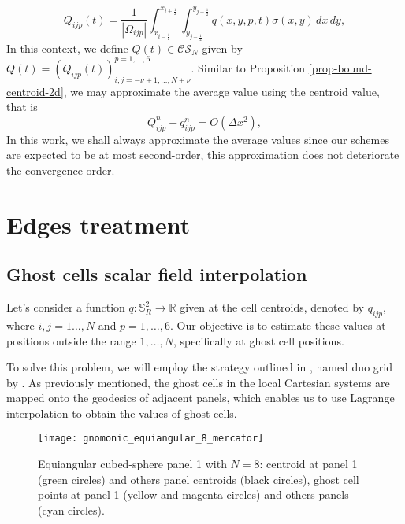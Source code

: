 \begin{equation*}
	Q_{ijp}(t) = \frac{1}{|\Omega_{ijp}|}\int_{x_{i-\frac{1}{2}}}^{x_{i+\frac{1}{2}}}
	\int_{y_{j-\frac{1}{2}}}^{y_{j+\frac{1}{2}}}  q(x,y,p,t) {\sigma(x,y)}\,dx \,dy,
\end{equation*}
In this context, we define $Q(t) \in \mathcal{CS}_N$ given by 
$Q(t) = (Q_{ijp}(t))_{i,j = -\nu +1, \ldots, N+\nu}^{p=1,\ldots,6}$.
Similar to Proposition \ref{prop-bound-centroid-2d}, we may approximate the average value using the centroid value, that is
\begin{equation*}
	Q_{ijp}^n - q_{ijp}^n = O(\Delta x ^2), 
\end{equation*}
In this work, we shall always approximate the average values since our schemes are expected to be at most second-order,
this approximation does not deteriorate the convergence order.

\section{Edges treatment}
\label{cs-halodata}
\subsection{Ghost cells scalar field interpolation}
\label{cs-interp}
Let's consider a function $q: \mathbb{S}^2_R \to \mathbb{R}$ given at the cell centroids, 
denoted by $q_{ijp}$, where $i, j=1\ldots, N$ and $p=1,\ldots, 6$. 
Our objective is to estimate these values at positions outside the range $1, \ldots, N$, specifically at ghost cell positions.

To solve this problem, we will employ the strategy outlined in \citet{zerroukat:2022}, 
named duo grid by \citet{chen:2021}.
As previously mentioned, the ghost cells in the local Cartesian systems are mapped onto the geodesics 
of adjacent panels, which enables us to use Lagrange interpolation to obtain the values of ghost cells.
\begin{figure}[!htb]
	\centering
	\texttt{[image: gnomonic\_equiangular\_8\_mercator]}
	\caption{Equiangular cubed-sphere panel 1 with $N=8$: 
	centroid at panel 1 (green circles) and others panel centroids (black circles), 
	ghost cell points at panel 1 (yellow and magenta circles) and others panels (cyan circles).}
	\label{chp4-cs-halodata}
\end{figure}

